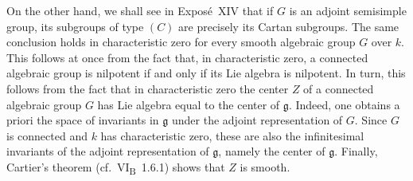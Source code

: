 \begin{enumerate}
  On the other hand, we shall see in Exposé~XIV that if \(G\) is an
  adjoint semisimple group, its subgroups of type \((C)\) are precisely
  its Cartan subgroups. The same conclusion holds in characteristic
  zero for every smooth algebraic group \(G\) over \(k\). This follows
  at once from the fact that, in characteristic zero, a connected
  algebraic group is nilpotent if and only if its Lie algebra is
  nilpotent. In turn, this follows from the fact that in
  characteristic zero the center \(Z\) of a connected algebraic group
  \(G\) has Lie algebra equal to the center of \(\mathfrak g\).
  Indeed, one obtains a priori the space of invariants in
  \(\mathfrak g\) under the adjoint representation of \(G\). Since
  \(G\) is connected and \(k\) has characteristic zero, these are also
  the infinitesimal invariants of the adjoint representation of
  \(\mathfrak g\), namely the center of \(\mathfrak g\). Finally,
  Cartier's theorem (cf.\ VI\textsubscript{B}~1.6.1) shows that \(Z\)
  is smooth.
\end{enumerate}



